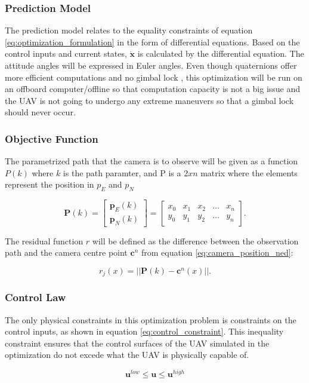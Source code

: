 \subsubsection{Prediction Model}

The prediction model relates to the equality constraints of equation \ref{eq:optimization_formulation} in the form of differential equations. Based on the control inputs and current states, $\mathbf{\dot{x}}$ is calculated by the differential equation. The attitude angles will be expressed in Euler angles. Even though quaternions offer more efficient computations and no gimbal lock \cite{uavBEARD}, this optimization will be run on an offboard computer/offline so that computation capacity is not a big issue and the UAV is not going to undergo any extreme maneuvers so that a gimbal lock should never occur.


\subsubsection{Objective Function}

The parametrized path that the camera is to observe will be given as a function $P(k)$ where $k$ is the path paramter, and P is a $2xn$ matrix where the elements represent the position in $p_E$ and $p_N$

\begin{equation}
	\mathbf{P}(k) = 
	\begin{bmatrix}
		\mathbf{p}_E(k) \\ \mathbf{p}_N(k)
	\end{bmatrix}
	=
	\begin{bmatrix}
		x_0 & x_1 & x_2 & \hdots & x_n \\
		y_0 & y_1 & y_2 & \hdots & y_n
	\end{bmatrix}.
\end{equation}

The residual function $r$ will be defined as the difference between the observation path and the camera centre point $\mathbf{c}^n$ from equation \ref{eq:camera_position_ned}:

\begin{equation}
	r_j(x) = ||\mathbf{P}(k) - \mathbf{c}^n(x)||.
\end{equation} 


\subsubsection{Control Law}

The only physical constraints in this optimization problem is constraints on the control inputs, as shown in equation \ref{eq:control_constraint}. This inequality constraint ensures that the control surfaces of the UAV simulated in the optimization do not excede what the UAV is physically capable of.

\begin{equation}
	\label{eq:control_constraint}
	\mathbf{u}^{low} \leq \mathbf{u} \leq \mathbf{u}^{high}
\end{equation}
